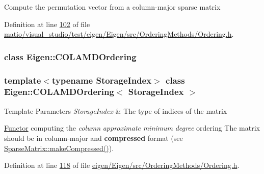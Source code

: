 Compute the permutation vector from a column-\/major sparse matrix 

Definition at line \hyperlink{matio_2visual__studio_2test_2eigen_2_eigen_2src_2_ordering_methods_2_ordering_8h_source_l00102}{102} of file \hyperlink{matio_2visual__studio_2test_2eigen_2_eigen_2src_2_ordering_methods_2_ordering_8h_source}{matio/visual\+\_\+studio/test/eigen/\+Eigen/src/\+Ordering\+Methods/\+Ordering.\+h}.

\label{class_eigen_1_1_c_o_l_a_m_d_ordering}
\subsubsection{class Eigen\+:\+:C\+O\+L\+A\+M\+D\+Ordering}
\subsubsection*{template$<$typename Storage\+Index$>$\newline
class Eigen\+::\+C\+O\+L\+A\+M\+D\+Ordering$<$ Storage\+Index $>$}


\begin{DoxyTemplParams}{Template Parameters}
{\em Storage\+Index} & The type of indices of the matrix\\
\hline
\end{DoxyTemplParams}
\hyperlink{struct_functor}{Functor} computing the {\itshape column} {\itshape approximate} {\itshape minimum} {\itshape degree} ordering The matrix should be in column-\/major and {\bfseries compressed} format (see \hyperlink{group___sparse_core___module_a5ff54ffc10296f9466dc81fa888733fd}{Sparse\+Matrix\+::make\+Compressed()}). 

Definition at line \hyperlink{eigen_2_eigen_2src_2_ordering_methods_2_ordering_8h_source_l00118}{118} of file \hyperlink{eigen_2_eigen_2src_2_ordering_methods_2_ordering_8h_source}{eigen/\+Eigen/src/\+Ordering\+Methods/\+Ordering.\+h}.

